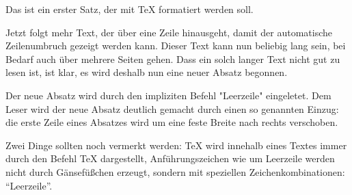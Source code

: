 


Das ist ein erster Satz, der mit TeX formatiert werden soll.

Jetzt folgt mehr Text, der über eine Zeile hinausgeht, damit der
automatische Zeilenumbruch gezeigt werden kann. Dieser Text kann nun
beliebig lang sein, bei Bedarf auch über mehrere Seiten gehen. Dass
ein solch langer Text nicht gut zu lesen ist, ist klar, es wird deshalb
nun eine neuer Absatz begonnen.

Der neue Absatz wird durch den impliziten Befehl "Leerzeile" eingeletet.
Dem Leser wird der neue Absatz deutlich gemacht durch einen so genannten
Einzug: die erste Zeile eines Absatzes wird um eine feste Breite nach
rechts verschoben.

Zwei Dinge sollten noch vermerkt werden: TeX wird innehalb eines Textes
immer durch den Befehl \TeX{} dargestellt, Anf\"uhrungszeichen wie um 
Leerzeile werden nicht durch G\"ansef\"u\ss chen erzeugt, sondern mit 
speziellen Zeichenkombinationen: ``Leerzeile''.



\bye


